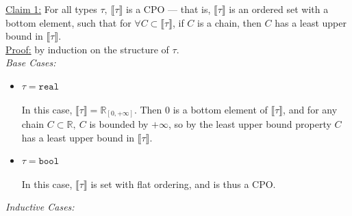 \documentclass{westhesis}
\newcommand{\R}{\mathbb{R}}
\begin{document}
\underline{Claim 1:} For all types $\tau, \ \llbracket \tau \rrbracket$ is a CPO --- that is, $\llbracket \tau \rrbracket$ is an ordered 
set with a bottom element, such that for $\forall C \subset \llbracket \tau \rrbracket$, if  $C$ is a chain, then $C$ has a least 
upper bound in $\llbracket \tau \rrbracket$. \\
\underline{Proof:} by induction on the structure of $\tau$. \\
\emph{Base Cases: }
\begin{itemize}
\item $\tau = \texttt{real}$ \\ \\
In this case, $\llbracket \tau \rrbracket = \R_{[0,+\infty]}$. Then $0$ is a bottom element of $\llbracket \tau \rrbracket$, and for 
any chain $C \subset \R, \ C$ is bounded by $+\infty$, so by the least upper bound property $C$ has a least upper bound in 
$\llbracket \tau \rrbracket$.
\item $\tau = \texttt{bool}$ \\ \\
In this case, $\llbracket \tau \rrbracket$ is set with flat ordering, and is thus a CPO. \\ 
\end{itemize}
\emph{Inductive Cases: }
\end{document}

